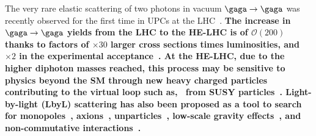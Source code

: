 \documentclass[../report.tex]{subfiles}
\begin{document}
The very rare elastic scattering of two photons in vacuum
$\gaga\to\gaga$  was recently
observed for the first time in UPCs at the LHC~\cite{Aaboud:2017bwk,CMS-PAS-FSQ-16-012}.
{\bf The increase in $\gaga\to\gaga$ yields from the LHC to the HE-LHC is of $\mathcal{O}(200)$ thanks to factors
of $\times 30$ larger cross sections times luminosities, and $\times 2$ in the experimental acceptance~\cite{dEnterria:2013yra,dEnterria:2016qsv}. 
At the HE-LHC, due to the higher diphoton masses
reached, this process may be sensitive to physics beyond the SM through new heavy charged particles contributing to the
virtual loop such as, \eg\ from SUSY
particles~\cite{Gounaris:1999gh}. Light-by-light (LbyL) scattering has also been proposed as a tool to
search for monopoles~\cite{Ginzburg:1998vb}, axions~\cite{Bernard:1997kj}, unparticles~\cite{Kikuchi:2008pr}, 
low-scale gravity effects~\cite{Cheung:1999ja}, and non-commutative interactions~\cite{Hewett:2000zp}.}







 
\end{document}
